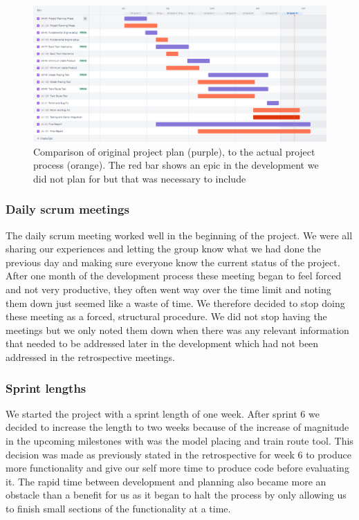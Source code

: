 \begin{figure}[H]
    \centering
    \vspace{12pt}
    \includegraphics[width=12cm]{figures/Jira comparisoncroped.png}
    \caption{Comparison of original project plan (purple), to the actual project process (orange). The red bar shows an epic in the development we did not plan for but that was necessary to include}
    \label{Epic_comparison_img}
\end{figure} 

\subsubsection{Daily scrum meetings}

The daily scrum meeting worked well in the beginning of the project. We were all sharing our experiences and letting the group know what we had done the previous day and making sure everyone know the current status of the project. After one month of the development process these meeting began to feel forced and not very productive, they often went way over the time limit and noting them down just seemed like a waste of time. We therefore decided to stop doing these meeting as a forced, structural procedure. We did not stop having the meetings but we only noted them down when there was any relevant information that needed to be addressed later in the development which had not been addressed in the retrospective meetings.

\subsubsection{Sprint lengths}

We started the project with a sprint length of one week. After sprint 6 we decided to increase the length to two weeks because of the increase of magnitude in the upcoming milestones with was the model placing and train route tool. This decision was made as previously stated in the retrospective for week 6 to produce more functionality and give our self more time to produce code before evaluating it. The rapid time between development and planning also became more an obstacle than a benefit for us as it began to halt the process by only allowing us to finish small sections of the functionality at a time.


